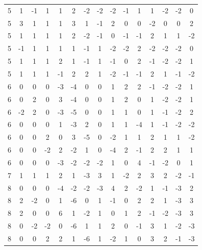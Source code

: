 \begin{table}[ht]
\begin{tabularx}{\linewidth}{ccccccccccccccc}
 5 & 1 & -1 & 1 & 1 & 2 & -2 & -2 & -2 & -1 & 1 & 1 & -2 & -2 & 0 \\
 5 & 3 & 1 & 1 & 1 & 3 & 1 & -1 & 2 & 0 & 0 & -2 & 0 & 0 & 2 \\
 5 & 1 & 1 & 1 & 1 & 2 & -2 & -1 & 0 & -1 & -1 & 2 & 1 & 1 & -2 \\
 5 & -1 & 1 & 1 & 1 & 1 & -1 & 1 & -2 & -2 & 2 & -2 & -2 & -2 & 0 \\
 5 & 1 & 1 & 1 & 2 & 1 & -1 & 1 & -1 & 0 & 2 & -1 & -2 & -2 & 1 \\
 5 & 1 & 1 & 1 & -1 & 2 & 2 & 1 & -2 & -1 & -1 & 2 & 1 & -1 & -2 \\
 6 & 0 & 0 & 0 & -3 & -4 & 0 & 0 & 1 & 2 & 2 & -1 & -2 & -2 & 1 \\
 6 & 0 & 2 & 0 & 3 & -4 & 0 & 0 & 1 & 2 & 0 & 1 & -2 & -2 & 1 \\
 6 & -2 & 2 & 0 & -3 & -5 & 0 & 0 & 1 & 1 & 0 & 1 & -1 & -2 & 2 \\
 6 & 0 & 0 & 0 & 1 & -3 & 2 & 0 & 1 & 1 & -4 & 1 & -1 & -2 & -2 \\
 6 & 0 & 0 & 2 & 0 & 3 & -5 & 0 & -2 & 1 & 1 & 2 & 1 & 1 & -2 \\
 6 & 0 & 0 & -2 & 2 & -2 & 1 & 0 & -4 & 2 & -1 & 2 & 2 & 1 & 1 \\
 6 & 0 & 0 & 0 & -3 & -2 & -2 & -2 & 1 & 0 & 4 & -1 & -2 & 0 & 1 \\
 7 & 1 & 1 & 1 & 2 & 1 & -3 & 3 & 1 & -2 & 2 & 3 & 2 & -2 & -1 \\
 8 & 0 & 0 & 0 & -4 & -2 & -2 & -3 & 4 & 2 & -2 & 1 & -1 & -3 & 2 \\
 8 & 2 & -2 & 0 & 1 & -6 & 0 & 1 & -1 & 0 & 2 & 2 & 1 & -3 & 3 \\
 8 & 2 & 0 & 0 & 6 & 1 & -2 & 1 & 0 & 1 & 2 & -1 & -2 & -3 & 3 \\
 8 & 0 & -2 & -2 & 0 & -6 & 1 & 1 & 2 & 0 & -1 & 3 & 1 & -2 & -3 \\
 8 & 0 & 0 & 2 & 2 & 1 & -6 & 1 & -2 & 1 & 0 & 3 & 2 & -1 & -3 
\end{tabularx}
\end{table}

\clearpage


\setlength{\bibsep}{3pt plus 3pt minus 2pt}

\nocite{apsrev41Control}



